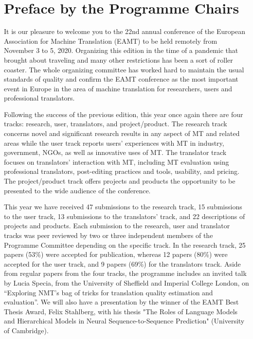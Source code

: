 \documentclass[a4paper,11pt,twoside]{book}
\begin{document}
\chapter*{Preface by the Programme Chairs}

It is our pleasure to welcome you to the 22nd annual conference of the European Association for Machine Translation (EAMT) to be held remotely from November 3 to 5, 2020. Organizing this edition in the time of a pandemic that brought about traveling and many other restrictions has been a sort of roller coaster. The whole organizing committee has worked hard to maintain the usual standards of quality and confirm the EAMT conference as the most important event in Europe in the area of machine translation for researchers, users and professional translators.

Following the success of the previous edition, this year once again there are four tracks: research, user, translators, and project/product. The research track concerns novel and significant research results in any aspect of MT and related areas while the user track reports users’ experiences with MT in industry, government, NGOs, as well as innovative uses of MT. The translator track focuses on translators’ interaction with MT, including MT evaluation using professional translators, post-editing practices and tools, usability, and pricing. The project/product track offers projects and products the opportunity to be presented to the wide audience of the conference.

This year we have received 47 submissions to the research track, 15 submissions to the user track, 13 submissions to the translators’ track, and 22 descriptions of projects and products. Each submission to the research, user and translator tracks was peer reviewed by two or three independent members of the Programme Committee depending on the specific track. In the research track, 25 papers (53\%) were accepted for publication, whereas 12 papers (80\%) were accepted for the user track, and 9 papers (69\%) for the translators track. 
Aside from regular papers from the four tracks, the programme includes an invited talk by Lucia Specia, from the University of Sheffield and Imperial College London, on “Exploring NMT’s bag of tricks for translation quality estimation and evaluation”. We will also have a presentation by the winner of the EAMT Best Thesis Award, Felix Stahlberg, with his thesis "The Roles of Language Models and Hierarchical Models in Neural Sequence-to-Sequence Prediction" (University of Cambridge).
\end{document}

